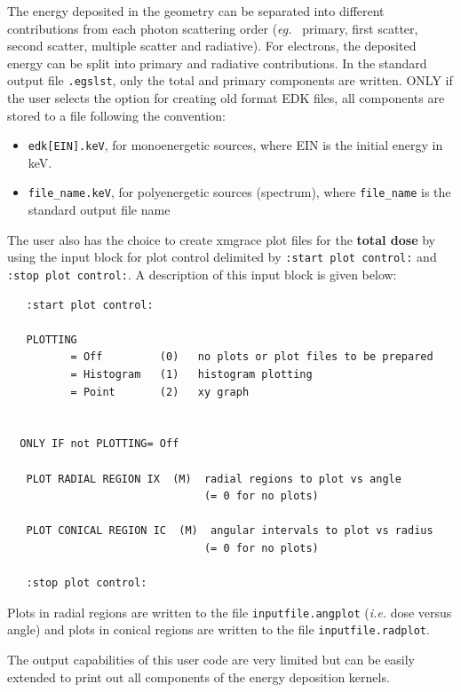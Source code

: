 \documentclass[12pt,twoside]{article}  %
\newcommand{\eg}{{\em eg.}}
\begin{document}
The energy deposited in the geometry can be separated into different
contributions from each photon scattering order (\eg~ primary,
first scatter, second scatter, multiple scatter and radiative). For
electrons, the deposited energy can be split into primary and radiative
contributions. In the standard output file {\tt *.egslst}, only the total
and primary components are written. ONLY if the user selects the option
for creating old format EDK files, all components are stored to a file
following the convention:
\begin{itemize}
\item {\tt edk[EIN].keV}, for monoenergetic sources, 
where EIN is the initial energy in keV.
\item {\tt file\_name.keV}, for polyenergetic sources (spectrum), 
where {\tt file\_name} is the standard output file name

\end{itemize}

The user also has the choice to 
create xmgrace plot files for the {\bf total dose} by using the input block for plot control delimited by 
{\tt :start plot control:} and {\tt:stop plot control:}. A description of this input block is 
given below:

\begin{verbatim}
   :start plot control: 

   PLOTTING
          = Off         (0)   no plots or plot files to be prepared
          = Histogram   (1)   histogram plotting
          = Point       (2)   xy graph


  ONLY IF not PLOTTING= Off

   PLOT RADIAL REGION IX  (M)  radial regions to plot vs angle
                               (= 0 for no plots)

   PLOT CONICAL REGION IC  (M)  angular intervals to plot vs radius
                               (= 0 for no plots)

   :stop plot control:
\end{verbatim}

Plots in radial regions are written to the file {\tt inputfile.angplot}
({\em i.e.} dose versus angle) and plots in conical regions are written
to the file {\tt inputfile.radplot}.

The output capabilities of this user code are very limited but can be
easily extended to print out all components of the energy deposition
kernels.
 
\typeout{}
\typeout{}
\renewcommand{\leftmark}{{REFERENCES}}
\renewcommand{\rightmark}{{REFERENCES}}
\end{document}
